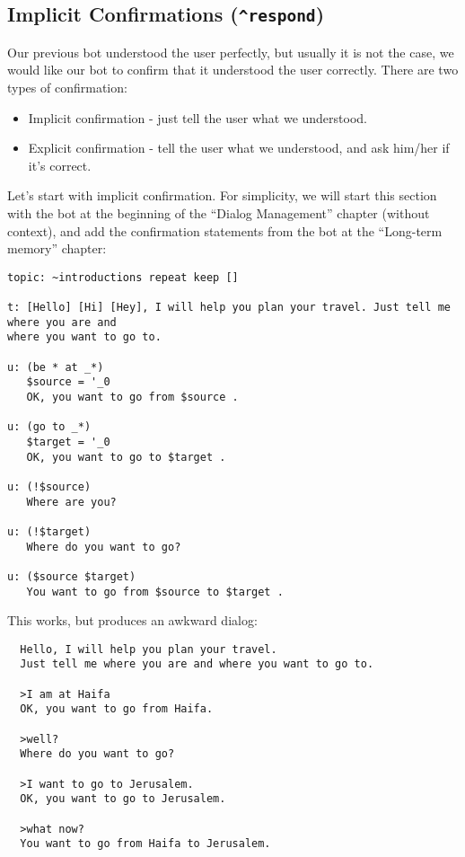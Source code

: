 \documentclass[]{article}
\providecommand{\tightlist}{%
  \setlength{\itemsep}{0pt}\setlength{\parskip}{0pt}}
\begin{document}
\subsection{\texorpdfstring{Implicit Confirmations
(\texttt{\^{}respond})}{Implicit Confirmations (\^{}respond)}}\label{implicit-confirmations-respond}

Our previous bot understood the user perfectly, but usually it is not
the case, we would like our bot to confirm that it understood the user
correctly. There are two types of confirmation:

\begin{itemize}
\tightlist
\item
  Implicit confirmation - just tell the user what we understood.
\item
  Explicit confirmation - tell the user what we understood, and ask
  him/her if it's correct.
\end{itemize}

Let's start with implicit confirmation. For simplicity, we will start
this section with the bot at the beginning of the ``Dialog Management''
chapter (without context), and add the confirmation statements from the
bot at the ``Long-term memory'' chapter:

\begin{verbatim}
topic: ~introductions repeat keep []

t: [Hello] [Hi] [Hey], I will help you plan your travel. Just tell me where you are and
where you want to go to.

u: (be * at _*)
   $source = '_0
   OK, you want to go from $source .

u: (go to _*)
   $target = '_0 
   OK, you want to go to $target .

u: (!$source)
   Where are you?

u: (!$target)
   Where do you want to go?

u: ($source $target)
   You want to go from $source to $target .
\end{verbatim}

This works, but produces an awkward dialog:

\begin{verbatim}
  Hello, I will help you plan your travel. 
  Just tell me where you are and where you want to go to.

  >I am at Haifa
  OK, you want to go from Haifa.

  >well?
  Where do you want to go?

  >I want to go to Jerusalem.
  OK, you want to go to Jerusalem.

  >what now?
  You want to go from Haifa to Jerusalem.
\end{verbatim}
\end{document}
